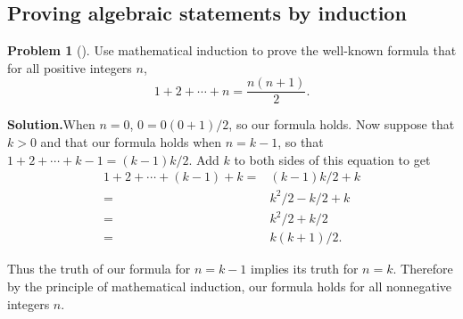 \documentclass[10pt,]{book}
\theoremstyle{plain}
\theoremstyle{definition}
\newtheorem{activity}[project]{Problem}
\theoremstyle{definition}
\numberwithin{equation}{chapter}
\newcommand{\amp}{&}
\begin{document}
\subsection[{Proving algebraic statements by induction}]{Proving algebraic statements by induction}\label{subsection-67}
\begin{activity}[]\label{activity-363}
Use mathematical induction to prove the well-known formula that for all positive integers \(n\),%
\begin{equation*}
1+2 + \cdots +n = \frac{n(n+1)}{2}.
\end{equation*}
%
\par\medskip\noindent%
\textbf{Solution.}\quad When \(n=0\), \(0=0(0+1)/2\), so our formula holds. Now suppose that\(k>0\) and that our formula holds when \(n=k-1\), so that \(1+2+\cdots+k-1=(k-1)k/2\). Add \(k\) to both sides of this equation to get%
\begin{align*}
1+2+\cdots+(k-1)+k =\amp  (k-1)k/2 +k\\
=\amp  k^2/2-k/2+k\\
=\amp
k^2/2+k/2\\
=\amp k(k+1)/2.
\end{align*}
%
\par
Thus the truth of our formula for \(n=k-1\) implies its truth for \(n=k\). Therefore by the principle of mathematical induction, our formula holds for all nonnegative integers \(n\).%
\end{activity}
\end{document}
